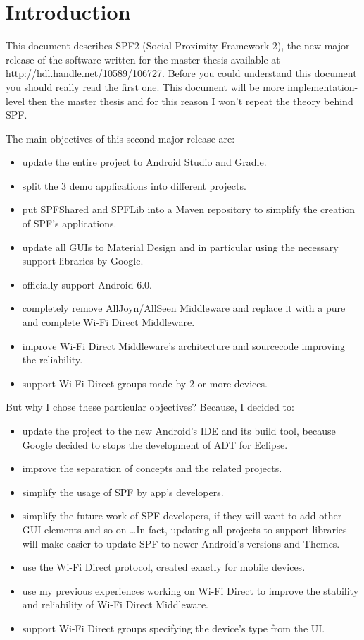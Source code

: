 \chapter{Introduction}
\label{chap1}

This document describes SPF2 (Social Proximity Framework 2), the new major release of the software written for the master thesis available at http://hdl.handle.net/10589/106727. Before you could understand this document you should really read the first one. This document will be more implementation-level then the master thesis and for this reason I won't repeat the theory behind SPF.

\noindent The main objectives of this second major release are:
\begin{itemize}
	\item update the entire project to Android Studio and Gradle.
	\item split the 3 demo applications into different projects.
	\item put \textsf{SPFShared} and \textsf{SPFLib} into a Maven repository to simplify the creation of SPF's applications.
	\item update all GUIs to Material Design and in particular using the necessary support libraries by Google.
	\item officially support Android 6.0.
	\item completely remove AllJoyn/AllSeen Middleware and replace it with a pure and complete Wi-Fi Direct Middleware.
	\item improve Wi-Fi Direct Middleware's architecture and sourcecode improving the reliability.
	\item support Wi-Fi Direct groups made by 2 or more devices.
\end{itemize}

\noindent But why I chose these particular objectives? Because, I decided to:
\begin{itemize}
	\item update the project to the new Android's IDE and its build tool, because Google decided to stops the development of ADT for Eclipse.
	\item improve the separation of concepts and the related projects.
	\item simplify the usage of SPF by app's developers.
	\item simplify the future work of SPF developers, if they will want to add other GUI elements and so on \dots In fact, updating all projects to support libraries will make easier to update SPF to newer Android's versions and Themes.
	\item use the Wi-Fi Direct protocol, created exactly for mobile devices.
	\item use my previous experiences working on Wi-Fi Direct to improve the stability and reliability of Wi-Fi Direct Middleware.
	\item support Wi-Fi Direct groups specifying the device's type from the UI.
\end{itemize}

